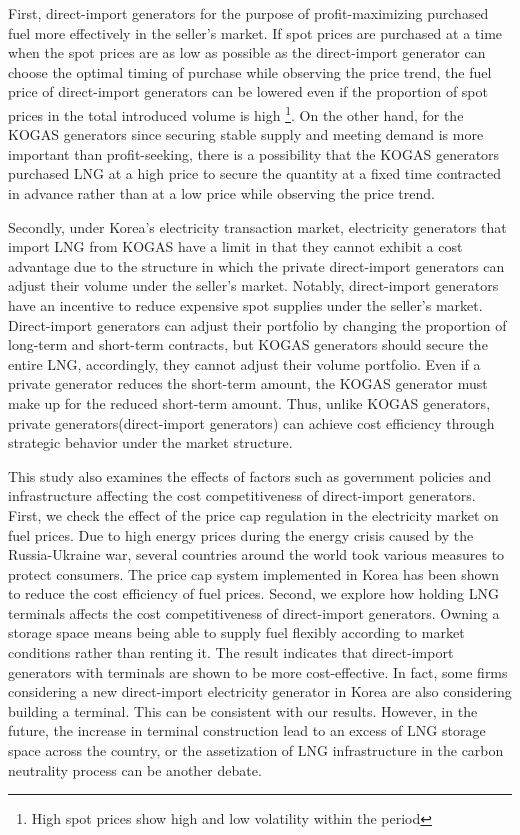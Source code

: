 \documentclass[12pt]{article}
\begin{document}
First, direct-import generators for the purpose of profit-maximizing purchased fuel more effectively in the seller's market. If spot prices are purchased at a time when the spot prices are as low as possible as the direct-import generator can choose the optimal timing of purchase while observing the price trend, the fuel price of direct-import generators can be lowered even if the proportion of spot prices in the total introduced volume is high \footnote{High spot prices show high and low volatility within the period}. 
On the other hand, for the KOGAS generators since securing stable supply and meeting demand is more important than profit-seeking, there is a possibility that the KOGAS generators purchased LNG at a high price to secure the quantity at a fixed time contracted in advance rather than at a low price while observing the price trend.


Secondly, under Korea's electricity transaction market, electricity generators that import LNG from KOGAS have a limit in that they cannot exhibit a cost advantage due to the structure in which the private direct-import generators can adjust their volume under the seller's market. Notably, direct-import generators have an incentive to reduce expensive spot supplies under the seller's market. Direct-import generators can adjust their portfolio by changing the proportion of long-term and short-term contracts, but KOGAS generators should secure the entire LNG, accordingly, they cannot adjust their volume portfolio. Even if a private generator reduces the short-term amount, the KOGAS generator must make up for the reduced short-term amount. Thus, unlike KOGAS generators, private generators(direct-import generators) can achieve cost efficiency through strategic behavior under the market structure. 

This study also examines the effects of factors such as government policies and infrastructure affecting the cost competitiveness of direct-import generators. First, we check the effect of the price cap regulation in the electricity market on fuel prices. Due to high energy prices during the energy crisis caused by the Russia-Ukraine war, several countries around the world took various measures to protect consumers. The price cap system implemented in Korea has been shown to reduce the cost efficiency of fuel prices. Second, we explore how holding LNG terminals affects the cost competitiveness of direct-import generators. Owning a storage space means being able to supply fuel flexibly according to market conditions rather than renting it. The result indicates that direct-import generators with terminals are shown to be more cost-effective. In fact, some firms considering a new direct-import electricity generator in Korea are also considering building a terminal. This can be consistent with our results. However, in the future, the increase in terminal construction lead to an excess of LNG storage space across the country, or the assetization of LNG infrastructure in the carbon neutrality process can be another debate.
\end{document}
